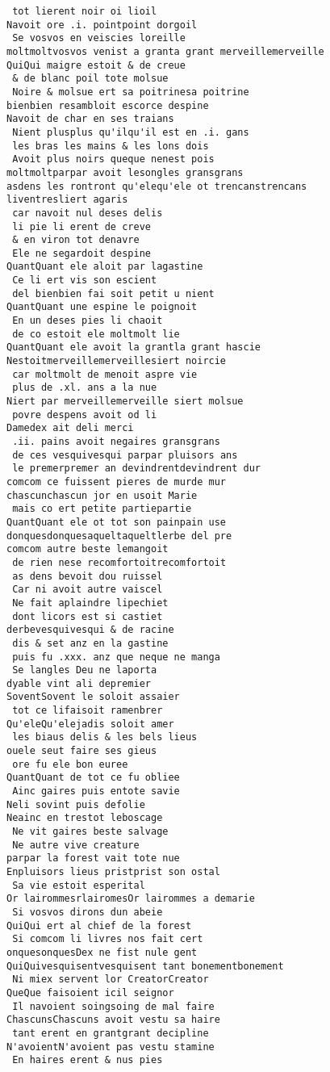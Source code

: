 \documentclass[
  letterpaper,
  DIV=11,
  numbers=noendperiod]{scrreprt}
\begin{document}
\begin{verbatim}
 tot lierent noir oi lioil
Navoit ore .i. pointpoint dorgoil
 Se vosvos en veiscies loreille
moltmoltvosvos venist a granta grant merveillemerveille
QuiQui maigre estoit & de creue
 & de blanc poil tote molsue
 Noire & molsue ert sa poitrinesa poitrine
bienbien resambloit escorce despine
Navoit de char en ses traians
 Nient plusplus qu'ilqu'il est en .i. gans
 les bras les mains & les lons dois
 Avoit plus noirs queque nenest pois
moltmoltparpar avoit lesongles gransgrans
asdens les rontront qu'elequ'ele ot trencanstrencans
liventresliert agaris
 car navoit nul deses delis
 li pie li erent de creve
 & en viron tot denavre
 Ele ne segardoit despine
QuantQuant ele aloit par lagastine
 Ce li ert vis son escient
 del bienbien fai soit petit u nient
QuantQuant une espine le poignoit
 En un deses pies li chaoit
 de co estoit ele moltmolt lie
QuantQuant ele avoit la grantla grant hascie
Nestoitmerveillemerveillesiert noircie
 car moltmolt de menoit aspre vie
 plus de .xl. ans a la nue
Niert par merveillemerveille siert molsue
 povre despens avoit od li
Damedex ait deli merci
 .ii. pains avoit negaires gransgrans
 de ces vesquivesqui parpar pluisors ans
 le premerpremer an devindrentdevindrent dur
comcom ce fuissent pieres de murde mur
chascunchascun jor en usoit Marie
 mais co ert petite partiepartie
QuantQuant ele ot tot son painpain use
donquesdonquesaqueltaqueltlerbe del pre
comcom autre beste lemangoit
 de rien nese recomfortoitrecomfortoit
 as dens bevoit dou ruissel
 Car ni avoit autre vaiscel
 Ne fait aplaindre lipechiet
 dont licors est si castiet
derbevesquivesqui & de racine
 dis & set anz en la gastine
 puis fu .xxx. anz que neque ne manga
 Se langles Deu ne laporta
dyable vint ali depremier
SoventSovent le soloit assaier
 tot ce lifaisoit ramenbrer
Qu'eleQu'elejadis soloit amer
 les biaus delis & les bels lieus
ouele seut faire ses gieus
 ore fu ele bon euree
QuantQuant de tot ce fu obliee
 Ainc gaires puis entote savie
Neli sovint puis defolie
Neainc en trestot leboscage
 Ne vit gaires beste salvage
 Ne autre vive creature
parpar la forest vait tote nue
Enpluisors lieus pristprist son ostal
 Sa vie estoit esperital
Or lairommesrlairomesOr lairommes a demarie
 Si vosvos dirons dun abeie
QuiQui ert al chief de la forest
 Si comcom li livres nos fait cert
onquesonquesDex ne fist nule gent
QuiQuivesquisentvesquisent tant bonementbonement
 Ni miex servent lor CreatorCreator
QueQue faisoient icil seignor
 Il navoient soingsoing de mal faire
ChascunsChascuns avoit vestu sa haire
 tant erent en grantgrant decipline
N'avoientN'avoient pas vestu stamine
 En haires erent & nus pies

\end{verbatim}
\end{document}
